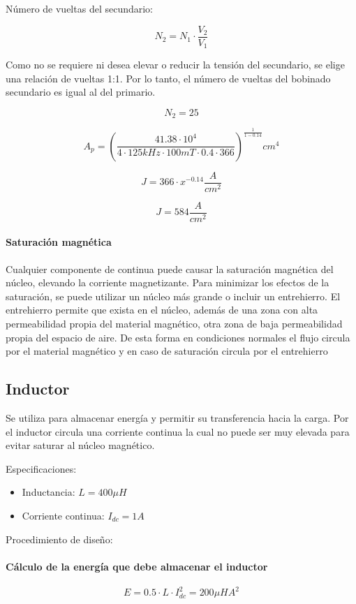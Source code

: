 Número de vueltas del secundario: 

$$ N_{2}=N_{1}\cdot\frac{V_{2}}{V_{1}} $$

Como no se requiere ni desea elevar o reducir la tensión del secundario, se elige una relación de vueltas 1:1. 
Por lo tanto, el número de vueltas del bobinado secundario es igual al del primario. 

$$ N_{2}=25 $$

$$ A_{p}=\left(\frac{41.38\cdot 10^{4}}{4\cdot 125kHz\cdot 100mT\cdot 0.4\cdot 366}\right)^{\frac{1}{1-0.14}} {cm}^4 $$

$$ J=366\cdot x^{-0.14} \frac{A}{cm^2} $$

$$ J=584 \frac{A}{cm^2} $$

\paragraph{Saturación magnética}

Cualquier componente de continua puede causar la saturación magnética del núcleo, 
elevando la corriente magnetizante. 
Para minimizar los efectos de la saturación, se puede utilizar un núcleo más grande o incluir un entrehierro.
El entrehierro permite que exista en el núcleo, además de una zona con alta permeabilidad propia del material magnético, 
otra zona de baja permeabilidad propia del espacio de aire. 
De esta forma en condiciones normales el flujo circula por el material magnético y en caso de saturación circula por el entrehierro 

\subsection{Inductor}

Se utiliza para almacenar energía y permitir su transferencia hacia la carga. 
Por el inductor circula una corriente continua la cual no puede ser muy elevada para evitar saturar al núcleo magnético. 

Especificaciones: 

\begin{itemize}
    \item Inductancia: $L=400\mu H$
    \item Corriente continua: $I_{dc}=1A$
\end{itemize}

Procedimiento de diseño:

\paragraph{Cálculo de la energía que debe almacenar el inductor}
$$ E=0.5\cdot L\cdot I_{dc}^2=200\mu HA^2 $$
